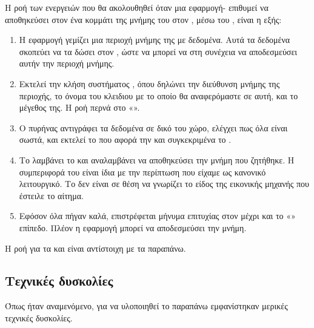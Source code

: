 Η ροή των ενεργειών που θα ακολουθηθεί όταν μια
εφαρμογή- επιθυμεί να αποθηκεύσει στον 
ένα κομμάτι της μνήμης του στον , μέσω του  , είναι η εξής:
\begin{enumerate}
  \item Η εφαρμογή γεμίζει μια περιοχή μνήμης της με δεδομένα.
  Αυτά τα δεδομένα σκοπεύει να τα δώσει στον , ώστε να μπορεί να στη συνέχεια
  να αποδεσμεύσει αυτήν την περιοχή μνήμης.

  \item Εκτελεί την κλήση συστήματος , όπου δηλώνει
  την διεύθυνση μνήμης της περιοχής, το όνομα του κλειδιου
  με το οποίο θα αναφερόμαστε σε αυτή, και το μέγεθος της. Η
  ροή περνά στο «».

  \item O πυρήνας αντιγράφει τα δεδομένα σε δικό του χώρο,
  ελέγχει πως όλα είναι σωστά, και εκτελεί το 
  που αφορά την  και συγκεκριμένα το .

  \item Το  λαμβάνει το  και
  αναλαμβάνει να αποθηκεύσει την μνήμη που ζητήθηκε. Η
  συμπεριφορά του είναι ίδια με την περίπτωση που
  είχαμε  ως κανονικό λειτουργικό. Το 
  δεν είναι σε θέση να γνωρίζει το είδος της εικονικής μηχανής που έστειλε το
  αίτημα.

  \item Εφόσον όλα πήγαν καλά, επιστρέφεται μήνυμα επιτυχίας
  στον  μέχρι και το «» επίπεδο. Πλέον η
  εφαρμογή μπορεί να αποδεσμεύσει την μνήμη.

\end{enumerate}

Η ροή για τα  και  είναι αντίστοιχη με τα παραπάνω.
\newline






\subsection{Τεχνικές δυσκολίες}
Όπως ήταν αναμενόμενο, για να υλοποιηθεί το παραπάνω εμφανίστηκαν
μερικές τεχνικές δυσκολίες.
\newline

